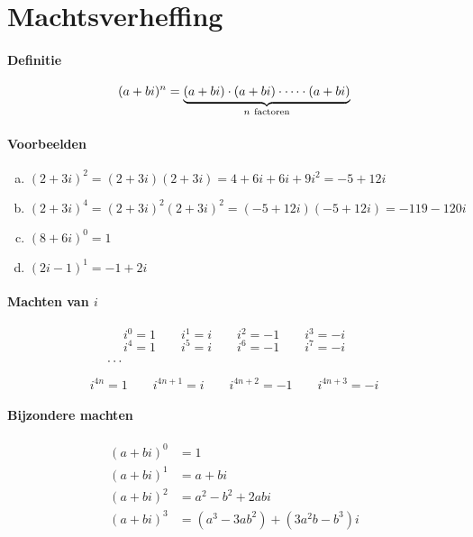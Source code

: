 \documentclass[12pt,twoside]{article}
\begin{document}
\pagebreak

\section{Machtsverheffing}

\paragraph*{Definitie}
\begin{mdframed}
$$(a+bi)^n = \underbrace{(a+bi)\cdot(a+bi)\cdot\cdots\cdot(a+bi)}_{n\mbox{ \scriptsize factoren}}$$
\end{mdframed}

\paragraph*{Voorbeelden}
\begin{enumerate}[(a)]
  \item $(2+3i)^2=(2+3i)(2+3i)=4+6i+6i+9i^2=-5+12i$
  \item $(2+3i)^4=(2+3i)^2(2+3i)^2=(-5+12i)(-5+12i)=-119-120i$
  \item $(8+6i)^0=1$
  \item $(2i-1)^1=-1+2i$
\end{enumerate}

\paragraph*{Machten van $i$}
$$i^0=1 \qquad i^1=i \qquad i^2=-1 \qquad i^3=-i$$
$$i^4=1 \qquad i^5=i \qquad i^6=-1 \qquad i^7=-i$$
$$\cdots\hspace*{6.7cm}$$

\begin{center}
\end{center}

$$i^{4n}=1 \qquad i^{4n+1}=i \qquad i^{4n+2}=-1 \qquad i^{4n+3}=-i$$

\paragraph*{Bijzondere machten}
\begin{align*}
  (a+bi)^0 &= 1\\
  (a+bi)^1 &= a+bi\\
  (a+bi)^2 &= a^2-b^2 + 2abi\\
  (a+bi)^3 &= (a^3 - 3ab^2) + (3a^2b -b^3)i\\
\end{align*}
\end{document}
